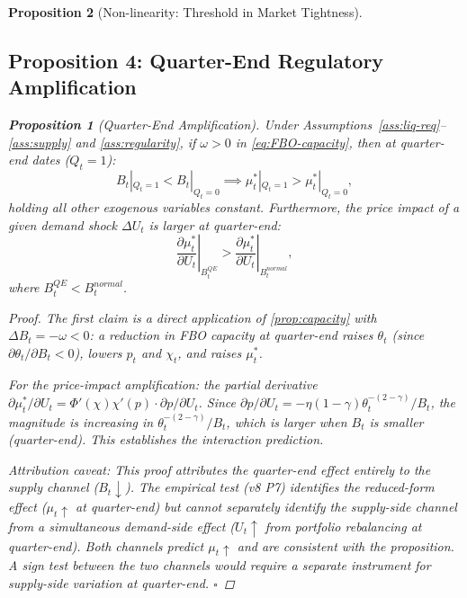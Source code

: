 \documentclass[12pt]{article}
\newtheorem{proposition}{Proposition}
\theoremstyle{definition}
\newcommand{\1}[1]{\mathds{1}\left[#1\right]}
\begin{document}
\begin{proposition}[Non-linearity: Threshold in Market Tightness]
\subsection{Proposition 4: Quarter-End Regulatory Amplification}

\begin{proposition}[Quarter-End Amplification]
  \label{prop:qe}
  Under Assumptions~\ref{ass:liq-req}--\ref{ass:supply} and
  \ref{ass:regularity}, if $\omega > 0$ in \eqref{eq:FBO-capacity}, then at
  quarter-end dates ($Q_t = 1$):
  \[
    B_t|_{Q_t=1} < B_t|_{Q_t=0} \implies \mu_t^*|_{Q_t=1} >
    \mu_t^*|_{Q_t=0},
  \]
  holding all other exogenous variables constant. Furthermore, the price impact
  of a given demand shock $\Delta U_t$ is larger at quarter-end:
  \[
    \left.\frac{\partial \mu_t^*}{\partial U_t}\right|_{B_t^{QE}}
    > \left.\frac{\partial \mu_t^*}{\partial U_t}\right|_{B_t^{normal}},
  \]
  where $B_t^{QE} < B_t^{normal}$.
\end{proposition}

\begin{proof}
  The first claim is a direct application of \cref{prop:capacity} with
  $\Delta B_t = -\omega < 0$: a reduction in FBO capacity at quarter-end
  raises $\theta_t$ (since $\partial\theta_t/\partial B_t < 0$), lowers $p_t$
  and $\chi_t$, and raises $\mu_t^*$.

  For the price-impact amplification: the partial derivative
  $\partial\mu_t^*/\partial U_t = \Phi'(\chi)\chi'(p)\cdot\partial p/\partial U_t$.
  Since $\partial p/\partial U_t = -\eta(1-\gamma)\theta_t^{-(2-\gamma)}/B_t$,
  the magnitude is increasing in $\theta_t^{-(2-\gamma)}/B_t$, which is
  larger when $B_t$ is smaller (quarter-end). This establishes the
  interaction prediction.

  \textit{Attribution caveat:} This proof attributes the quarter-end effect
  entirely to the supply channel ($B_t \downarrow$). The empirical test
  (v8 P7) identifies the reduced-form effect ($\mu_t \uparrow$ at quarter-end)
  but cannot separately identify the supply-side channel from a simultaneous
  demand-side effect ($U_t \uparrow$ from portfolio rebalancing at quarter-end).
  Both channels predict $\mu_t \uparrow$ and are consistent with the proposition.
  A sign test between the two channels would require a separate instrument for
  supply-side variation at quarter-end.
  \hfill$\square$
\end{proof}


\end{proposition}
\end{document}
